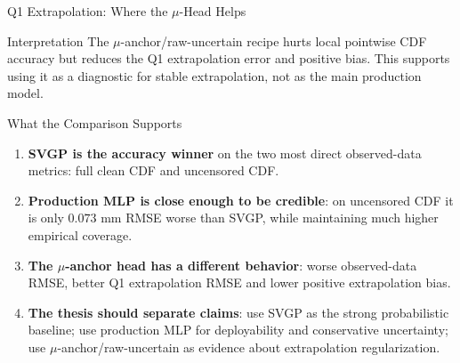 \documentclass[UTF8,aspectratio=169]{ctexbeamer}
\begin{document}
\begin{frame}{Q1 Extrapolation: Where the \(\mu\)-Head Helps}
\small
\begin{center}
\renewcommand{\arraystretch}{1.16}
\setlength{\tabcolsep}{3pt}
\end{center}

\vspace{0.5em}
\begin{block}{Interpretation}
The \(\mu\)-anchor/raw-uncertain recipe hurts local pointwise CDF accuracy but reduces the
Q1 extrapolation error and positive bias. This supports using it as a diagnostic for
stable extrapolation, not as the main production model.
\end{block}
\end{frame}

\begin{frame}{What the Comparison Supports}
\small
\begin{enumerate}\setlength\itemsep{6pt}
  \item \textbf{SVGP is the accuracy winner} on the two most direct observed-data metrics:
        full clean CDF and uncensored CDF.
  \item \textbf{Production MLP is close enough to be credible}: on uncensored CDF it is only
        \(0.073\) mm RMSE worse than SVGP, while maintaining much higher empirical coverage.
  \item \textbf{The \(\mu\)-anchor head has a different behavior}: worse observed-data RMSE,
        better Q1 extrapolation RMSE and lower positive extrapolation bias.
  \item \textbf{The thesis should separate claims}: use SVGP as the strong probabilistic
        baseline; use production MLP for deployability and conservative uncertainty;
        use \(\mu\)-anchor/raw-uncertain as evidence about extrapolation regularization.
\end{enumerate}
\end{frame}
\end{document}

